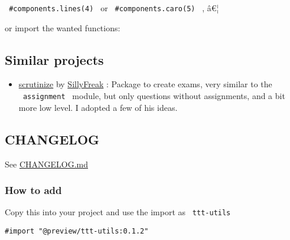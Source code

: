 \texttt{\ \#components.lines(4)\ } or \texttt{\ \#components.caro(5)\ }
, â€¦

or import the wanted functions:

\begin{Shaded}
\begin{Highlighting}[]



\NormalTok{\#assignment[First assignment}

\NormalTok{    \#question[}
\NormalTok{    ]}
\NormalTok{]}
\end{Highlighting}
\end{Shaded}

\subsection{Similar projects}\label{similar-projects}

\begin{itemize}
\tightlist
\item
  \href{https://github.com/SillyFreak/typst-packages/tree/main/scrutinize}{scrutinize}
  by \href{https://github.com/SillyFreak}{SillyFreak} : Package to
  create exams, very similar to the \texttt{\ assignment\ } module, but
  only questions without assignments, and a bit more low level. I
  adopted a few of his ideas.
\end{itemize}

\subsection{CHANGELOG}\label{changelog}

See
\href{https://github.com/typst/packages/raw/main/packages/preview/ttt-utils/CHANGELOG.md}{CHANGELOG.md}

\subsubsection{How to add}\label{how-to-add}

Copy this into your project and use the import as \texttt{\ ttt-utils\ }

\begin{verbatim}
#import "@preview/ttt-utils:0.1.2"
\end{verbatim}

